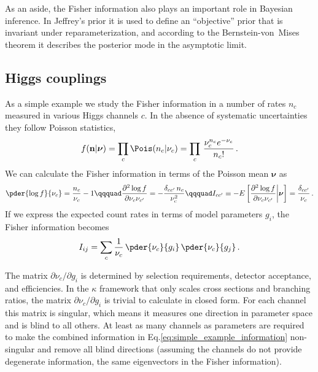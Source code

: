 As an aside, the Fisher information also plays an important role in Bayesian
inference. In Jeffrey's prior it is used to define an ``objective''
prior that is invariant under reparameterization, and according to the
Bernstein-von~Mises theorem it describes the posterior mode in the
asymptotic limit. 




\subsection{Higgs couplings}
\label{sec:information_formalism_example}

As a simple example we study the Fisher information in a number of
rates $n_c$ measured in various Higgs channels $c$. In the absence of
systematic uncertainties they follow Poisson statistics,
%
\begin{align}
  f (\mathbf{n} |\boldsymbol{\nu}) 
  = \prod_c \Pois (n_c | \nu_c) 
  = \prod_c \, \frac{\nu_c^{n_c} e^{-\nu_c}}{n_c!} \, .
\end{align}
%
We can calculate the Fisher information in terms of the Poisson mean
$\boldsymbol{\nu}$ as
%
\begin{align}
  \pder { \log f} {\nu_c} 
  = \frac {n_c} {\nu_c} - 1 \qqquad 
  \frac { \partial^2 \log f} {\partial \nu_c \nu_{c'}} = - \frac {\delta_{c c'} \, n_c} {\nu_c^2} \qqquad
  I_{c c'} \equiv - E \left[ \frac { \partial^2 \log f} {\partial \nu_c \nu_{c'}} \middle| \boldsymbol{\nu} \right] = \frac {\delta_{c c'} } {\nu_c} \,.
\end{align}
%
If we express the expected count rates in terms of model parameters
$g_i$, the Fisher information becomes
%
\begin{align}
  I_{ij}  = \sum_c \frac 1 {\nu_c} \, \pder {\nu_c} {g_i} \, \pder {\nu_{c}} {g_j} \,.
  \label{eq:simple_example_information}
\end{align}

The matrix $\partial \nu_c / \partial g_i$ is determined by selection
requirements, detector acceptance, and efficiencies.  In the $\kappa$
framework that only scales cross sections and branching ratios, the
matrix $\partial \nu_c / \partial g_i$ is trivial to calculate in
closed form.  For each channel this matrix is singular, which means it
measures one direction in parameter space and is blind to all
others. At least as many channels as parameters are required to make
the combined information in Eq.\;\eqref{eq:simple_example_information}
non-singular and remove all blind directions (assuming the channels do
not provide degenerate information, \ie the same eigenvectors in the
Fisher information).\bigskip

